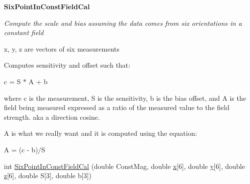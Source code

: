 \begin{Indent}{\bf \-Six\-Point\-In\-Const\-Field\-Cal}\par
{\em \-Compute the scale and bias assuming the data comes from six orientations in a constant field

x, y, z are vectors of six measurements

\-Computes sensitivity and offset such that\-:

c = \-S $\ast$ \-A + b

where c is the measurement, \-S is the sensitivity, b is the bias offset, and \-A is the field being measured expressed as a ratio of the measured value to the field strength. aka a direction cosine.

\-A is what we really want and it is computed using the equation\-:

\-A = (c -\/ b)/\-S }\begin{DoxyCompactItemize}
\item 
int \hyperlink{class_calibration_aaf643402ea9690b33d40ec8b79382b54}{\-Six\-Point\-In\-Const\-Field\-Cal} (double \-Const\-Mag, double \hyperlink{_o_p_plots_8m_a9336ebf25087d91c818ee6e9ec29f8c1}{x}\mbox{[}6\mbox{]}, double \hyperlink{_o_p_plots_8m_a2fb1c5cf58867b5bbc9a1b145a86f3a0}{y}\mbox{[}6\mbox{]}, double \hyperlink{_o_p_plots_8m_a25ed1bcb423b0b7200f485fc5ff71c8e}{z}\mbox{[}6\mbox{]}, double \-S\mbox{[}3\mbox{]}, double b\mbox{[}3\mbox{]})
\end{DoxyCompactItemize}
\end{Indent}
